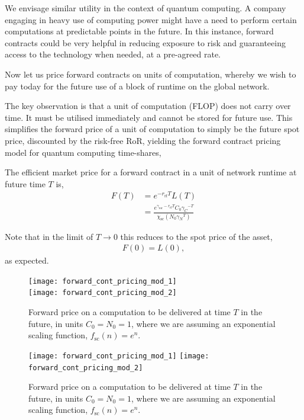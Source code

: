 We envisage similar utility in the context of quantum computing. A company engaging in heavy use of computing power might have a need to perform certain computations at predictable points in the future. In this instance, forward contracts could be very helpful in reducing exposure to risk and guaranteeing access to the technology when needed, at a pre-agreed rate.

Now let us price forward contracts on units of computation, whereby we wish to pay today for the future use of a block of runtime on the global network.

The key observation is that a unit of computation (FLOP) does not carry over time. It must be utilised immediately and cannot be stored for future use. This simplifies the forward price of a unit of computation to simply be the future spot price, discounted by the risk-free RoR, yielding the forward contract pricing model for quantum computing time-shares,
\begin{definition} \label{def:forward_cont}
The efficient market price for a forward contract in a unit of network runtime at future time $T$ is,
\begin{align}
F(T) &= e^{-r_\mathrm{rf}T} L(T)\nonumber\\
&=\frac{e^{\gamma_\mathrm{ror}-r_\mathrm{rf}T} C_0{\gamma_C}^{-T}}{\chi_\mathrm{sc}(N_0 {\gamma_N}^T)}
\end{align}
\end{definition}

Note that in the limit of \mbox{$T\to 0$} this reduces to the spot price of the asset,
\begin{align}
	F(0)=L(0),
\end{align}
as expected.

\pubmode
\begin{figure}[!htbp]
\texttt{[image: forward\_cont\_pricing\_mod\_1]}\\
\texttt{[image: forward\_cont\_pricing\_mod\_2]}
\captionspacefig \caption{Forward price on a computation to be delivered at time $T$ in the future, in units \mbox{$C_0=N_0=1$}, where we are assuming an exponential scaling function, \mbox{$f_\mathrm{sc}(n)=e^n$}.}\label{fig:forward_cont_pricing_mod}
\end{figure}
\else
\begin{figure}[!htbp]
\texttt{[image: forward\_cont\_pricing\_mod\_1]}
\texttt{[image: forward\_cont\_pricing\_mod\_2]}
\captionspacefig \caption{Forward price on a computation to be delivered at time $T$ in the future, in units \mbox{$C_0=N_0=1$}, where we are assuming an exponential scaling function, \mbox{$f_\mathrm{sc}(n)=e^n$}.}\label{fig:forward_cont_pricing_mod}
\end{figure}
\fi


